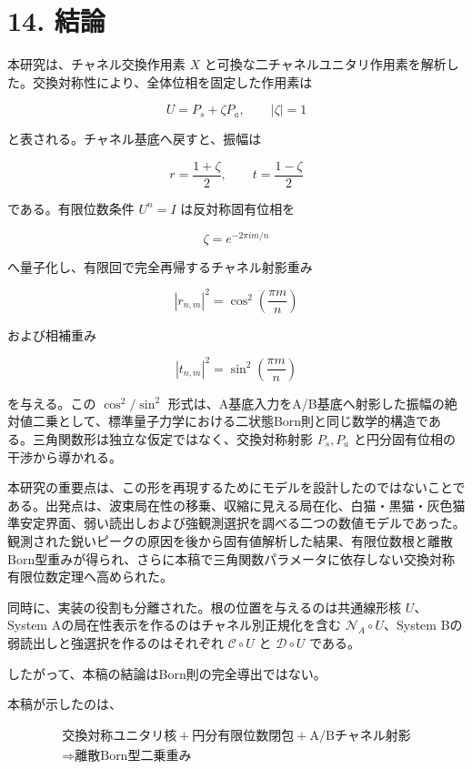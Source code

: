 \documentclass[
  a4paper,
  10pt]{article}
\begin{document}
\section{14. 結論}\label{14-ux7d50ux8ad6}

本研究は、チャネル交換作用素 \(X\)
と可換な二チャネルユニタリ作用素を解析した。交換対称性により、全体位相を固定した作用素は

\[
U=P_s+\zeta P_a,
\qquad |\zeta|=1
\]

と表される。チャネル基底へ戻すと、振幅は

\[
r=\frac{1+\zeta}{2},
\qquad
t=\frac{1-\zeta}{2}
\]

である。有限位数条件 \(U^n=I\) は反対称固有位相を

\[
\zeta=e^{-2\pi im/n}
\]

へ量子化し、有限回で完全再帰するチャネル射影重み

\[
\boxed{
|r_{n,m}|^2=\cos^2\left(\frac{\pi m}{n}\right)
}
\]

および相補重み

\[
\boxed{
|t_{n,m}|^2=\sin^2\left(\frac{\pi m}{n}\right)
}
\]

を与える。この \(\cos^2/\sin^2\)
形式は、A基底入力をA/B基底へ射影した振幅の絶対値二乗として、標準量子力学における二状態Born則と同じ数学的構造である。三角関数形は独立な仮定ではなく、交換対称射影
\(P_s,P_a\) と円分固有位相の干渉から導かれる。

本研究の重要点は、この形を再現するためにモデルを設計したのではないことである。出発点は、波束局在性の移乗、収縮に見える局在化、白猫・黒猫・灰色猫準安定界面、弱い読出しおよび強観測選択を調べる二つの数値モデルであった。観測された鋭いピークの原因を後から固有値解析した結果、有限位数根と離散Born型重みが得られ、さらに本稿で三角関数パラメータに依存しない交換対称有限位数定理へ高められた。

同時に、実装の役割も分離された。根の位置を与えるのは共通線形核
\(U\)、System Aの局在性表示を作るのはチャネル別正規化を含む
\(\mathcal N_A\circ U\)、System Bの弱読出しと強選択を作るのはそれぞれ
\(\mathcal C\circ U\) と \(\mathcal D\circ U\) である。

したがって、本稿の結論はBorn則の完全導出ではない。

本稿が示したのは、

\[
\boxed{
\begin{gathered}
\text{交換対称ユニタリ核}
+\text{円分有限位数閉包}
+\text{A/Bチャネル射影}\\
\Rightarrow\text{離散Born型二乗重み}
\end{gathered}
}
\]
\end{document}
